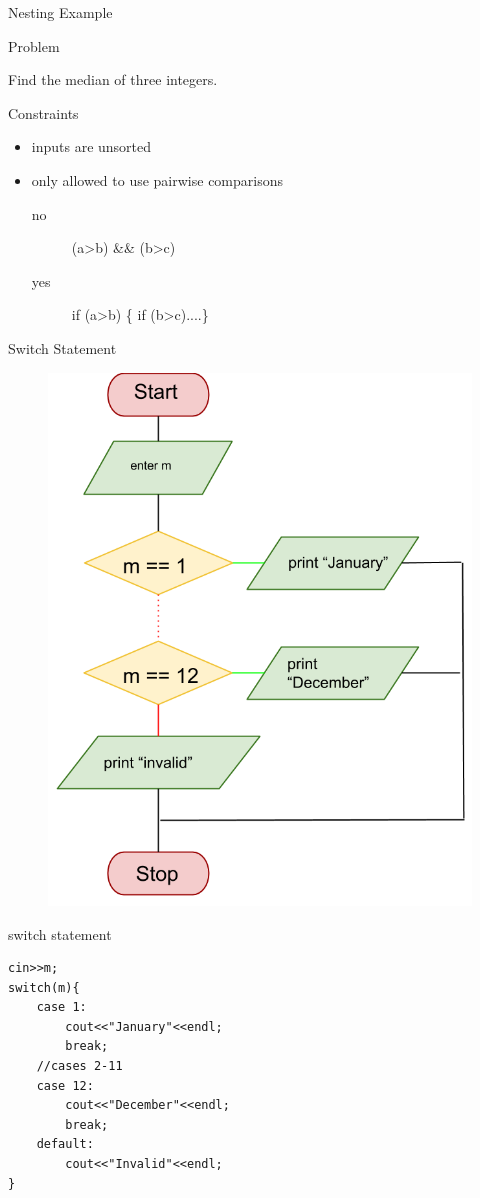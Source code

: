 \documentclass[xcolor={dvipsnames}]{beamer}
\begin{document}
\begin{frame}{Nesting Example}
	\begin{block}{Problem}
		\begin{center}
	 		Find the median of three  integers.
		\end{center}
	\end{block}
	\pause
	\begin{block}{Constraints}
		\begin{itemize}
			\item inputs are unsorted
			\item only allowed to use pairwise comparisons 
			\begin{description}
				\item[no] (a\textgreater b) \&\& (b\textgreater c)
				\item[yes] if (a\textgreater b) \{ if (b\textgreater c)....\}
			\end{description}
		\end{itemize}
	\end{block}
\end{frame}


\begin{frame}{Switch Statement}
\begin{center}	
	\begin{figure}
		\includegraphics[width=.6\textwidth]{switch}
	\end{figure}
	\end{center}
\end{frame}

\begin{frame}[fragile]{switch statement}
\begin{verbatim}
cin>>m;
switch(m){
    case 1: 
        cout<<"January"<<endl; 
        break;
    //cases 2-11
    case 12:
        cout<<"December"<<endl;
        break;
    default:
        cout<<"Invalid"<<endl;
}
\end{verbatim}
\end{frame}
\end{document}
